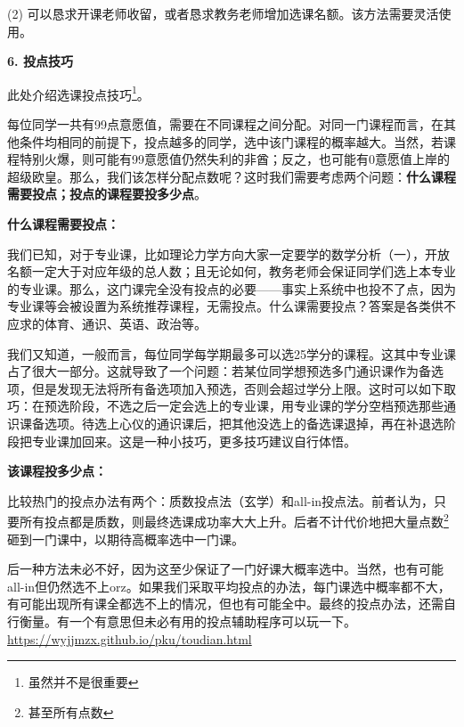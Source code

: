 (2) 可以恳求开课老师收留，或者恳求教务老师增加选课名额。该方法需要灵活使用。

\vspace{10pt}

\textbf{6. 投点技巧}

此处介绍选课投点技巧\footnote{虽然并不是很重要}。

\vspace{10pt}

每位同学一共有99点意愿值，需要在不同课程之间分配。对同一门课程而言，在其他条件均相同的前提下，投点越多的同学，选中该门课程的概率越大。当然，若课程特别火爆，则可能有99意愿值仍然失利的非酋；反之，也可能有0意愿值上岸的超级欧皇。那么，我们该怎样分配点数呢？这时我们需要考虑两个问题：\textbf{什么课程需要投点；投点的课程要投多少点}。

\vspace{10pt}

\textbf{什么课程需要投点：}

\vspace{10pt}

我们已知，对于专业课，比如理论力学方向大家一定要学的数学分析（一），开放名额一定大于对应年级的总人数；且无论如何，教务老师会保证同学们选上本专业的专业课。那么，这门课完全没有投点的必要——事实上系统中也投不了点，因为专业课等会被设置为系统推荐课程，无需投点。什么课需要投点？答案是各类供不应求的体育、通识、英语、政治等。

\vspace{10pt}

我们又知道，一般而言，每位同学每学期最多可以选25学分的课程。这其中专业课占了很大一部分。这就导致了一个问题：若某位同学想预选多门通识课作为备选项，但是发现无法将所有备选项加入预选，否则会超过学分上限。这时可以如下取巧：在预选阶段，不选之后一定会选上的专业课，用专业课的学分空档预选那些通识课备选项。待选上心仪的通识课后，把其他没选上的备选课退掉，再在补退选阶段把专业课加回来。这是一种小技巧，更多技巧建议自行体悟。

\vspace{10pt}

\textbf{该课程投多少点：}

\vspace{10pt}

比较热门的投点办法有两个：质数投点法（玄学）和all-in投点法。前者认为，只要所有投点都是质数，则最终选课成功率大大上升。后者不计代价地把大量点数\footnote{甚至所有点数}砸到一门课中，以期待高概率选中一门课。

\vspace{10pt}

后一种方法未必不好，因为这至少保证了一门好课大概率选中。当然，也有可能all-in但仍然选不上orz。如果我们采取平均投点的办法，每门课选中概率都不大，有可能出现所有课全都选不上的情况，但也有可能全中。最终的投点办法，还需自行衡量。有一个有意思但未必有用的投点辅助程序可以玩一下。\href{https://wyjjmzx.github.io/pku/toudian.html}{https://wyjjmzx.github.io/pku/toudian.html}

